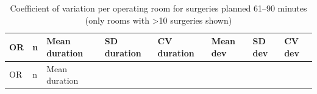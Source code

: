 \documentclass[
]{article}
\begin{document}
\begin{longtable}[]{@{}
  >{\centering\arraybackslash}p{}
  >{\centering\arraybackslash}p{}
  >{\centering\arraybackslash}p{}
  >{\centering\arraybackslash}p{}
  >{\centering\arraybackslash}p{}
  >{\centering\arraybackslash}p{}
  >{\centering\arraybackslash}p{}
  >{\centering\arraybackslash}p{}@{}}
\caption{Coefficient of variation per operating room for surgeries
planned 61--90 minutes (only rooms with \textgreater10 surgeries shown)
\label{tab:cv_room_61_90}}\tabularnewline
\toprule\noalign{}
\begin{minipage}[b]{\linewidth}\centering
OR
\end{minipage} & \begin{minipage}[b]{\linewidth}\centering
n
\end{minipage} & \begin{minipage}[b]{\linewidth}\centering
Mean duration
\end{minipage} & \begin{minipage}[b]{\linewidth}\centering
SD duration
\end{minipage} & \begin{minipage}[b]{\linewidth}\centering
CV duration
\end{minipage} & \begin{minipage}[b]{\linewidth}\centering
Mean dev
\end{minipage} & \begin{minipage}[b]{\linewidth}\centering
SD dev
\end{minipage} & \begin{minipage}[b]{\linewidth}\centering
CV dev
\end{minipage} \\
\midrule\noalign{}
\endfirsthead
\toprule\noalign{}
\begin{minipage}[b]{\linewidth}\centering
OR
\end{minipage} & \begin{minipage}[b]{\linewidth}\centering
n
\end{minipage} & \begin{minipage}[b]{\linewidth}\centering
Mean duration
\end{minipage} & \begin{minipage}[b]{\linewidth}\centering

\end{minipage}
\end{longtable}
\end{document}
